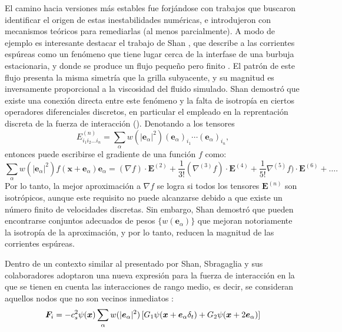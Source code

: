 El camino hacia versiones m\'as estables fue forj\'andose con trabajos que buscaron identificar el origen de estas inestabilidades num\'ericas, e introdujeron con mecanismos te\'oricos para remediarlas (al menos parcialmente). A modo de ejemplo es interesante destacar el trabajo de Shan \cite{shan_analysis_2006}, que describe a las corrientes esp\'ureas como un fen\'omeno que tiene lugar cerca de la interfase de una burbuja estacionaria, y donde se produce un flujo peque\~no pero finito . El patr\'on de este flujo presenta la misma simetr\'ia que la grilla subyacente, y su magnitud es inversamente proporcional a la viscosidad del fluido simulado. Shan demostr\'o que existe una conexi\'on directa entre este fen\'omeno y la falta de isotrop\'ia en ciertos operadores diferenciales discretos, en particular el empleado en la reprentaci\'on discreta de la fuerza de interacci\'on (). Denotando a los tensores 
\begin{equation}
	E^{(n)}_{i_1i_2\ldots i_n} = \sum_{\alpha}w(|\bm{e}_{\alpha}|^2)(\bm{e}_{\alpha})_{i_1} \cdots (\bm{e}_{\alpha})_{i_n},
\end{equation}
entonces puede escribirse el gradiente de una funci\'on $f$ como:
\begin{equation}
	\sum_{\alpha}w(|\bm{e}_{\alpha}|^2) f(\bm{x}+\bm{e}_{\alpha})\bm{e}_{\alpha}=(\nabla f)\cdot \bm{E}^{(2)} + \dfrac{1}{3!}(\nabla^{(3)} f)\cdot \bm{E}^{(4)} + \dfrac{1}{5!}\nabla^{(5)} f)\cdot \bm{E}^{(6)} + \ldots.
\end{equation}
Por lo tanto, la mejor aproximaci\'on a $\nabla f$ se logra si todos los tensores $\bm{E}^{(n)}$ son isotr\'opicos, aunque este requisito no puede alcanzarse debido a que existe un n\'umero finito de  velocidades discretas. Sin embargo, Shan demostr\'o que pueden encontrarse conjuntos adecuados de pesos $\{ w(\bm{e}_{\alpha})\}$ que mejoran notoriamente la isotrop\'ia de la aproximaci\'on, y por lo tanto, reducen la magnitud de las corrientes esp\'ureas.

Dentro de un contexto similar al presentado por Shan, Sbragaglia y sus colaboradores adoptaron una nueva expresi\'on para la fuerza de interacci\'on en la que se tienen en cuenta las interacciones de rango medio, es decir, se consideran aquellos nodos que no son vecinos inmediatos \cite{sbragaglia_generalized_2007}:
\begin{equation}
	\bm{F}_i = -c_s^2 \psi(\bm{x}) \sum_{\alpha} w(|\bm{e}_{\alpha}|^2) \left[G_1 \psi(\bm{x} + \bm{e}_{\alpha}\delta_t)  + G_2 \psi(\bm{x}+2\bm{e}_{\alpha}) \right]
	\label{eq:fi_sbragaglia}
\end{equation}


